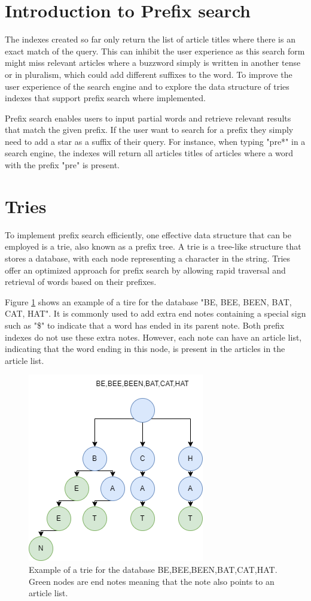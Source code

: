 \section{Introduction to Prefix search}
The indexes created so far only return the list of article titles where there is an exact match of the query. This can inhibit the user experience as this search form might miss relevant articles where a buzzword simply is written in another tense or in  pluralism, which could add different suffixes to the word. To improve the user experience of the search engine and to explore the data structure of tries indexes that support prefix search where implemented.

Prefix search enables users to input partial words and retrieve relevant results that match the given prefix. If the user want to search for a prefix they simply need to add a star as a suffix of their query. For instance, when typing "pre*" in a search engine, the indexes will return all articles titles of articles where a word with the prefix "pre" is present. 


\section{Tries}

To implement prefix search efficiently, one effective data structure that can be employed is a trie, also known as a prefix tree. A trie is a tree-like structure that stores a database, with each node representing a character in the string. Tries offer an optimized approach for prefix search by allowing rapid traversal and retrieval of words based on their prefixes.

Figure \ref{fig:trie-st-example} shows an example of a tire for the database "BE, BEE, BEEN, BAT, CAT, HAT". It is commonly used to add extra end notes containing a special sign such as "\$" to indicate that a word has ended in its parent note. Both prefix indexes do not use these extra notes. However, each note can have an article list, indicating that the word ending in this node, is present in the articles in the article list.  

\begin{figure}[ht!]
    \centering
    \includegraphics[width=.5\textwidth]{LaTeX/Figures/trie.png}
    \caption{Example of a trie for the database BE,BEE,BEEN,BAT,CAT,HAT. Green nodes are end notes meaning that the note also points to an article list.}
    \label{fig:trie-st-example}
\end{figure}